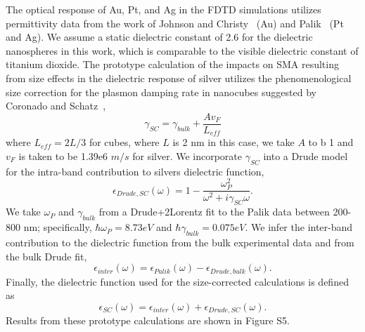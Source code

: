 \documentclass[journal=jpclcd,manuscript=suppinfo]{achemso}
\begin{document}
The optical response of Au, Pt, and Ag in the FDTD simulations utilizes permittivity 
data from the work of Johnson and Christy~\cite{JC_PRB_1972} (Au) and Palik~\cite{Palik} (Pt and Ag).  
We assume a static dielectric constant of 2.6 for
the dielectric nanospheres in this work, which is comparable to the visible dielectric constant of titanium dioxide. 
The prototype calculation of the impacts on SMA resulting from size effects in the dielectric response
of silver utilizes the phenomenological size correction for the plasmon damping rate in nanocubes suggested by 
Coronado and Schatz~\cite{CS_JCP_2003},
\begin{equation}
\gamma_{SC} = \gamma_{bulk} + \frac{A v_F}{L_{eff}}
\end{equation}
where $L_{eff} = 2 L/3$ for cubes, where $L$ is 2 nm in this case, we take $A$ to b 1
and $v_F$ is taken to be 1.39e6 $m/s$ for silver.    
We incorporate $\gamma_{SC}$ into a Drude model for the intra-band contribution to silvers dielectric function,
\begin{equation}
\epsilon_{Drude,SC}(\omega) = 1 - \frac{\omega_P^2}{\omega^2 + i\gamma_{SC}\omega}.
\end{equation}
We take $\omega_P$ and $\gamma_{bulk}$ from a Drude+2Lorentz fit to the Palik data between 200-800 nm;
specifically, $\hbar \omega_P = 8.73 eV$ and $\hbar \gamma_{bulk} = 0.075 eV$.  We infer the
inter-band contribution to the dielectric function from the bulk experimental data and from the bulk Drude fit,
\begin{equation}
\epsilon_{inter}(\omega) = \epsilon_{Palik}(\omega) - \epsilon_{Drude,bulk}(\omega).
\end{equation}
Finally, the dielectric function used for the size-corrected calculations is defined as
\begin{equation}
\epsilon_{SC}(\omega) = \epsilon_{inter}(\omega) + \epsilon_{Drude,SC}(\omega).
\end{equation}
Results from these prototype calculations are shown in Figure S5.
 
\end{document}
